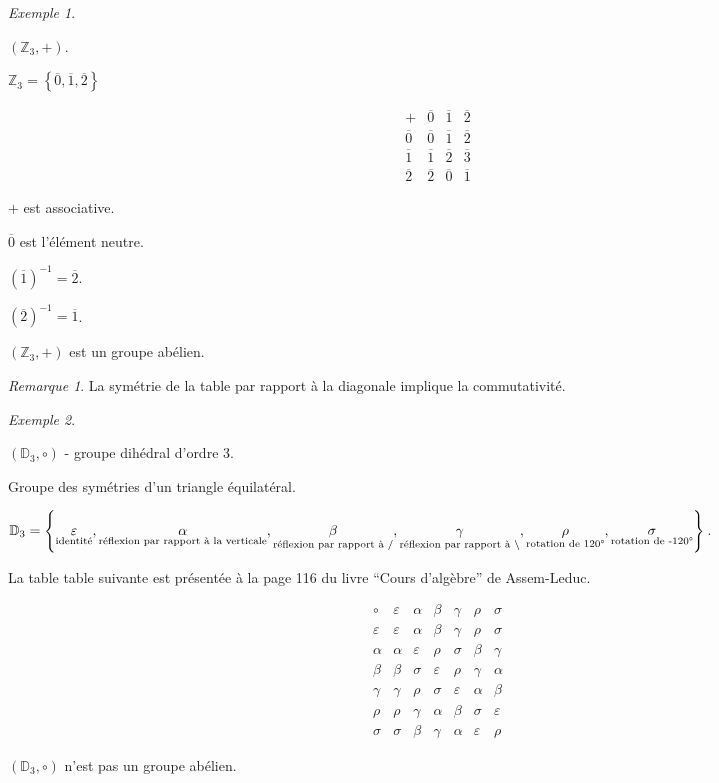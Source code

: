 \documentclass{report}
\theoremstyle{definition}
\theoremstyle{remark}
\newtheorem*{exem}{Exemple}
\newtheorem*{rema}{Remarque}
\begin{document}
	\begin{exem}
		~

		$\left( \mathbb{Z}_3,+ \right)$.

		$\mathbb{Z}_3=\left\lbrace \overline{0}, \overline{1}, \overline{2} \right\rbrace$

		\renewcommand{\arraystretch}{1.5}
		\[
		\begin{array}{c||c|c|c}
			+&\overline0&\overline1&\overline2\\
			\hline\hline
			\overline0&\overline0&\overline1&\overline2\\
			\hline
			\overline1&\overline1&\overline2&\overline3\\
			\hline
			\overline2&\overline2&\overline0&\overline1
		\end{array}
		\]
		\renewcommand{\arraystretch}{1}

		$+$ est associative.

		$\overline{0}$ est l'\'el\'ement neutre.

		$(\overline{1})^{-1}=\overline{2}$.

		$(\overline{2})^{-1}=\overline{1}$.

		$\left( \mathbb{Z}_3,+ \right)$ est un groupe ab\'elien.
		\begin{rema}
			La sym\'etrie de la table par rapport \`a la diagonale implique la commutativit\'e.
		\end{rema}
	\end{exem}
	\begin{exem}
		~

		$\left( \mathbb{D}_3, \circ \right)$ - groupe dih\'edral d'ordre 3.

		Groupe des sym\'etries d'un triangle \'equilat\'eral.

		$\mathbb{D}_3=\left\lbrace \underset{\text{identit\'e}}{\varepsilon}, \underset{\text{r\'eflexion par rapport \`a la verticale}}{\alpha}, \underset{\text{r\'eflexion par rapport \`a /}}{\beta}, \underset{\text{r\'eflexion par rapport \`a \textbackslash}}{\gamma}, \underset{\text{rotation de 120\textdegree}}{\rho}, \underset{\text{rotation de -120\textdegree}}{\sigma} \right\rbrace$.

		La table table suivante est pr\'esent\'ee \`a la page 116 du livre ``Cours d'alg\`ebre'' de Assem-Leduc.

		\[
		\begin{array}{c||c|c|c|c|c|c}
			\circ&\varepsilon&\alpha&\beta&\gamma&\rho&\sigma\\
			\hline\hline
			\varepsilon&\varepsilon&\alpha&\beta&\gamma&\rho&\sigma\\
			\hline
			\alpha&\alpha&\varepsilon&\rho&\sigma&\beta&\gamma\\
			\hline
			\beta&\beta&\sigma&\varepsilon&\rho&\gamma&\alpha\\
			\hline
			\gamma&\gamma&\rho&\sigma&\varepsilon&\alpha&\beta\\
			\hline
			\rho&\rho&\gamma&\alpha&\beta&\sigma&\varepsilon\\
			\hline
			\sigma&\sigma&\beta&\gamma&\alpha&\varepsilon&\rho
		\end{array}
		\]

		$\left( \mathbb{D}_3, \circ \right)$ n'est pas un groupe ab\'elien.
	\end{exem}
\end{document}
